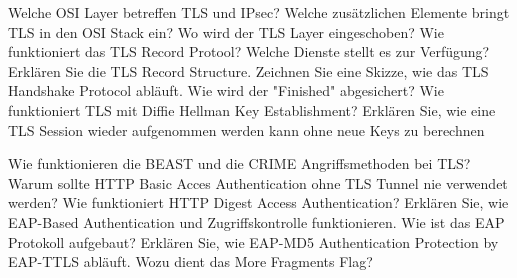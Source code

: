 \documentclass[ngerman,a4paper,12pt]{scrreprt}
\begin{document}
\olR
	\li Welche OSI Layer betreffen TLS und IPsec? Welche zusätzlichen Elemente bringt TLS in den OSI Stack ein? Wo wird der TLS Layer eingeschoben?
	\li Wie funktioniert das TLS Record Protool? Welche Dienste stellt es zur Verfügung?
	\li Erklären Sie die TLS Record Structure.
	\li Zeichnen Sie eine Skizze, wie das TLS Handshake Protocol abläuft.
	\li Wie wird der "Finished" abgesichert?
	\li Wie funktioniert TLS mit Diffie Hellman Key Establishment?
	\li Erklären Sie, wie eine TLS Session wieder aufgenommen werden kann ohne neue Keys zu berechnen
\olS

\olR
	\li Wie funktionieren die BEAST und die CRIME Angriffsmethoden bei TLS?
	\li Warum sollte HTTP Basic Acces Authentication ohne TLS Tunnel nie verwendet werden?
	\li Wie funktioniert HTTP Digest Access Authentication?
	\li Erklären Sie, wie EAP-Based Authentication und Zugriffskontrolle funktionieren.
	\li Wie ist das EAP Protokoll aufgebaut?
	\li Erklären Sie, wie EAP-MD5 Authentication Protection by EAP-TTLS abläuft. Wozu dient das More Fragments Flag?
\olS
\end{document}
